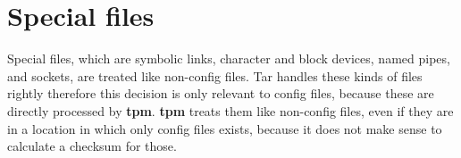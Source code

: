 \documentclass[a4paper]{article}
\newcommand{\program}[1]{\textbf{#1}}
\begin{document}
	\section{Special files}
	\label{sec:special_files}
	
	Special files, which are symbolic links, character and block devices, named pipes, and sockets, are treated like non-config files. Tar handles these kinds of files rightly therefore this decision is only relevant to config files, because these are directly processed by \program{tpm}. \program{tpm} treats them like non-config files, even if they are in a location in which only config files exists, because it does not make sense to calculate a checksum for those.
\end{document}
